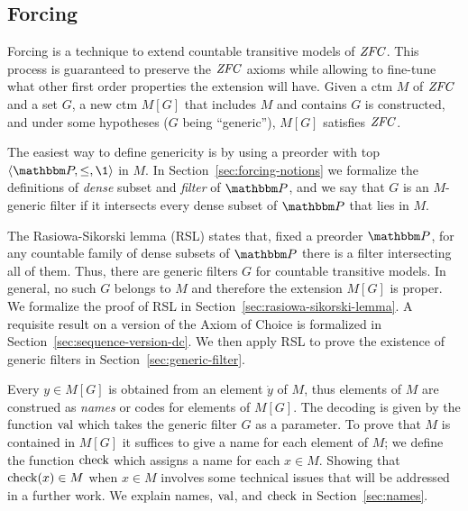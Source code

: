 \subsection{Forcing}
Forcing is a technique to extend countable transitive models of
$\mathit{ZFC}$. This process is guaranteed to preserve the $\mathit{ZFC}$
axioms while allowing to fine-tune what other first order properties the
extension will have. Given a ctm $M$  of $\mathit{ZFC}$ and a set $G$, a new
ctm  $M[G]$  that includes $M$ and
contains $G$ is constructed, and under some hypotheses ($G$ being ``generic''),
$M[G]$ satisfies $\mathit{ZFC}$.

The easiest way to define genericity is by using a preorder with top
$\lb\PP,\leq,\1\rb$ in $M$.   
In Section~\ref{sec:forcing-notions} we formalize the definitions of
\emph{dense} subset and  \emph{filter} of  $\PP$, and we say that  $G$
is an $M$-generic filter
if it intersects every dense subset of $\PP$ that lies in $M$.

The Rasiowa-Sikorski lemma (RSL) states that, fixed a preorder $\PP$, for
any countable family of dense subsets of $\PP$ there is a filter
intersecting all of them. Thus, there are generic filters $G$ for
countable transitive models. In general, no such $G$ belongs to $M$ and
therefore the extension $M[G]$ is proper. We formalize the proof of
RSL in
Section~\ref{sec:rasiowa-sikorski-lemma}. A requisite result on a
version of the Axiom of Choice is formalized in
Section~\ref{sec:sequence-version-dc}. We then apply RSL to prove the existence of generic
filters in Section~\ref{sec:generic-filter}. 

Every  $y \in M[G]$ is obtained from an element $\dot y$ of $M$, thus
elements of $M$ are construed as \emph{names} or codes for elements of
$M[G]$.
The decoding is given by the function
$\operatorname{val}$ which takes the generic filter $G$ as a parameter. To
prove that $M$ is contained in $M[G]$ it suffices to give a name for
each element of $M$; we define the function $\operatorname{check}$ which assigns
a name for each $x\in M$. Showing that $\operatorname{check}(x)\in M$
when $x\in M$ involves some technical issues that will
be addressed in a further work. We explain names, $\operatorname{val}$, and
$\operatorname{check}$ in Section~\ref{sec:names}.

